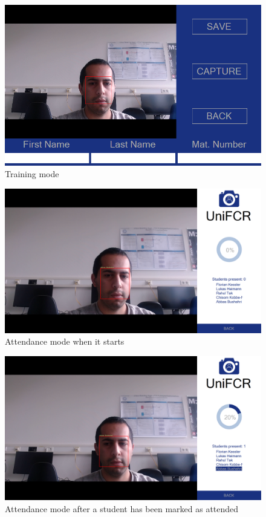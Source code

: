 \documentclass[12pt, a4paper]{article}
\begin{document}
\begin{figure}[htb]
	\centering
		\includegraphics[width=1.0\columnwidth]{images/train}
	\caption{Training mode}
	\label{fig:train}
\end{figure}
\begin{figure}[htb]
	\centering
		\includegraphics[width=1.0\columnwidth]{images/before}
	\caption{Attendance mode when it starts}
	\label{fig:before}
\end{figure}
\begin{figure}[htb]
	\centering
		\includegraphics[width=1.0\columnwidth]{images/after}
	\caption{Attendance mode after a student has been marked as attended}
	\label{fig:after}
\end{figure}
\end{document}
